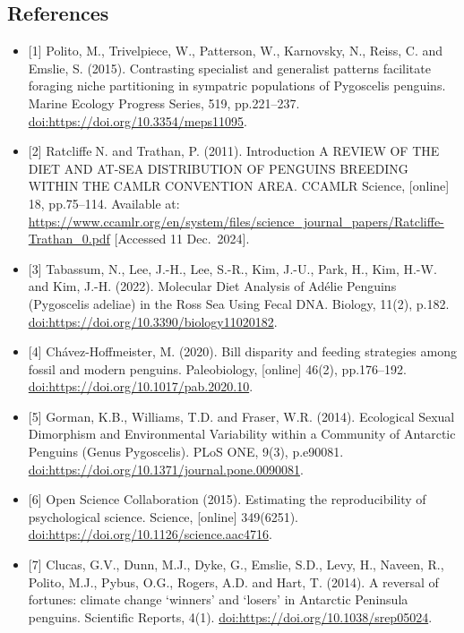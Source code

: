 \documentclass[
]{article}
\begin{document}
\subsection{References}\label{references}

\begin{itemize}
\item
  {[}1{]} Polito, M., Trivelpiece, W., Patterson, W., Karnovsky, N.,
  Reiss, C. and Emslie, S. (2015). Contrasting specialist and generalist
  patterns facilitate foraging niche partitioning in sympatric
  populations of Pygoscelis penguins. Marine Ecology Progress Series,
  519, pp.221--237. \url{doi:https://doi.org/10.3354/meps11095}.
\item
  {[}2{]} RatcliffeN. and Trathan, P. (2011). Introduction A REVIEW OF
  THE DIET AND AT-SEA DISTRIBUTION OF PENGUINS BREEDING WITHIN THE CAMLR
  CONVENTION AREA. CCAMLR Science, {[}online{]} 18, pp.75--114.
  Available at:
  \url{https://www.ccamlr.org/en/system/files/science_journal_papers/Ratcliffe-Trathan_0.pdf}
  {[}Accessed 11 Dec.~2024{]}.
\item
  {[}3{]} Tabassum, N., Lee, J.-H., Lee, S.-R., Kim, J.-U., Park, H.,
  Kim, H.-W. and Kim, J.-H. (2022). Molecular Diet Analysis of Adélie
  Penguins (Pygoscelis adeliae) in the Ross Sea Using Fecal DNA.
  Biology, 11(2), p.182.
  \url{doi:https://doi.org/10.3390/biology11020182}.
\item
  {[}4{]} Chávez-Hoffmeister, M. (2020). Bill disparity and feeding
  strategies among fossil and modern penguins. Paleobiology,
  {[}online{]} 46(2), pp.176--192.
  \url{doi:https://doi.org/10.1017/pab.2020.10}.
\item
  {[}5{]} Gorman, K.B., Williams, T.D. and Fraser, W.R. (2014).
  Ecological Sexual Dimorphism and Environmental Variability within a
  Community of Antarctic Penguins (Genus Pygoscelis). PLoS ONE, 9(3),
  p.e90081. \url{doi:https://doi.org/10.1371/journal.pone.0090081}.
\item
  {[}6{]} Open Science Collaboration (2015). Estimating the
  reproducibility of psychological science. Science, {[}online{]}
  349(6251). \url{doi:https://doi.org/10.1126/science.aac4716}.
\item
  {[}7{]} Clucas, G.V., Dunn, M.J., Dyke, G., Emslie, S.D., Levy, H.,
  Naveen, R., Polito, M.J., Pybus, O.G., Rogers, A.D. and Hart, T.
  (2014). A reversal of fortunes: climate change `winners' and `losers'
  in Antarctic Peninsula penguins. Scientific Reports, 4(1).
  \url{doi:https://doi.org/10.1038/srep05024}.
\end{itemize}
\end{document}
